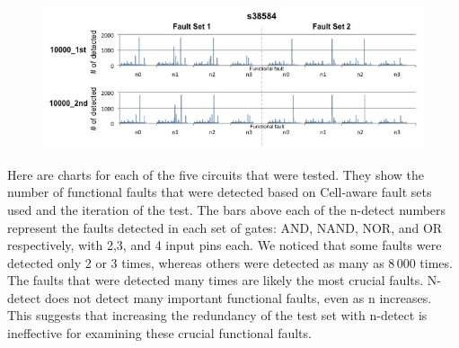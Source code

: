 \documentclass[10 pt, technote]{IEEEtran}
\begin{document}
\begin{figure}[H]
\includegraphics[scale=0.2,width = \linewidth]{../Figures/detections_s38584.jpg}
\end{figure}


Here are charts for each of the five circuits that were tested. They show the number of functional faults that were detected based on Cell-aware fault sets used and the iteration of the test. The bars above each of the n-detect numbers represent the faults detected in each set of gates: AND, NAND, NOR, and OR respectively, with 2,3, and 4 input pins each. We noticed that some faults were detected only 2 or 3 times, whereas others were detected as many as 8\,000 times. The faults that were detected many times are likely the most crucial faults. N-detect does not detect many important functional faults, even as n increases. This suggests that increasing the redundancy of the test set with n-detect is ineffective for examining these crucial functional faults.
\end{document}

